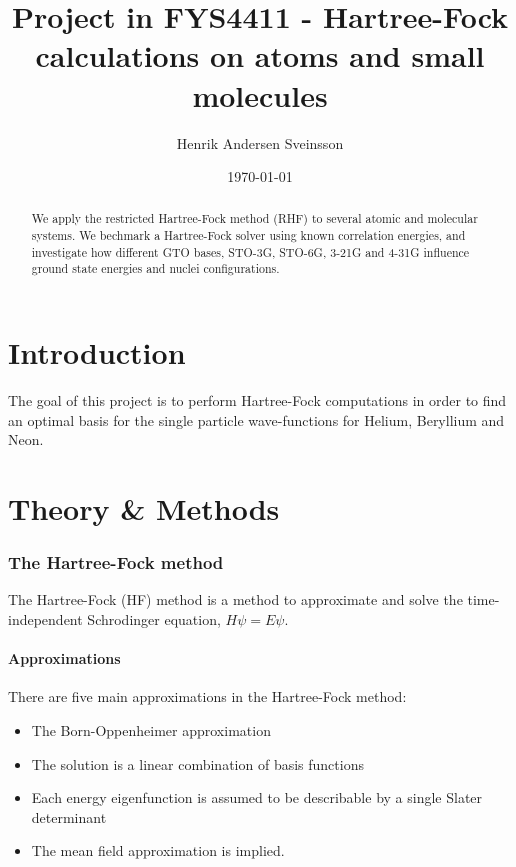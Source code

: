\documentclass[a4paper,10pt, twocolumn, pre]{revtex4}
\begin{document}
\title{Project in FYS4411 - Hartree-Fock calculations on atoms and small molecules}
\author{Henrik Andersen Sveinsson}
\date{\today}

\begin{abstract}
We apply the restricted Hartree-Fock method (RHF) to several atomic and molecular systems. We bechmark a Hartree-Fock solver using known correlation energies, and investigate how different GTO bases, STO-3G, STO-6G, 3-21G and 4-31G influence ground state energies and nuclei configurations.
\end{abstract}
\maketitle


\part{Introduction}
The goal of this project is to perform Hartree-Fock computations in order to find an optimal basis for the single particle wave-functions for Helium, Beryllium and Neon.

\part{Theory \& Methods}
\section{The Hartree-Fock method}
The Hartree-Fock (HF) method is a method to approximate and solve the time-independent Schrodinger equation, $H\psi = E\psi$. 
\subsection{Approximations}
There are five main approximations in the Hartree-Fock method:
\begin{itemize}
 \item The Born-Oppenheimer approximation
 \item The solution is a linear combination of basis functions
 \item Each energy eigenfunction is assumed to be describable by a single Slater determinant
 \item The mean field approximation is implied. 
\end{itemize}
\end{document}
